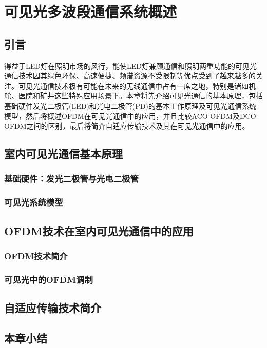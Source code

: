 
\chapter{可见光多波段通信系统概述}
\section{引言}
得益于LED灯在照明市场的风行，能使LED灯兼顾通信和照明两重功能的可见光通信技术因其绿色环保、高速便捷、频谱资源不受限制等优点受到了越来越多的关注。可见光通信技术极有可能在未来的无线通信中占有一席之地，特别是诸如机舱、医院和矿井这些特殊应用场景下。本章将先介绍可见光通信的基本原理，包括基础硬件发光二极管(LED)和光电二极管(PD)的基本工作原理及可见光通信系统模型，然后将概述OFDM在可见光通信中的应用，并且比较ACO-OFDM及DCO-OFDM之间的区别，最后将简介自适应传输技术及其在可见光通信中的应用。
\section{室内可见光通信基本原理}
\subsection{基础硬件：发光二极管与光电二极管}
\subsection{可见光系统模型}
\section{OFDM技术在室内可见光通信中的应用}
\subsection{OFDM技术简介}
\subsection{可见光中的OFDM调制}
\section{自适应传输技术简介}
\section{本章小结}

